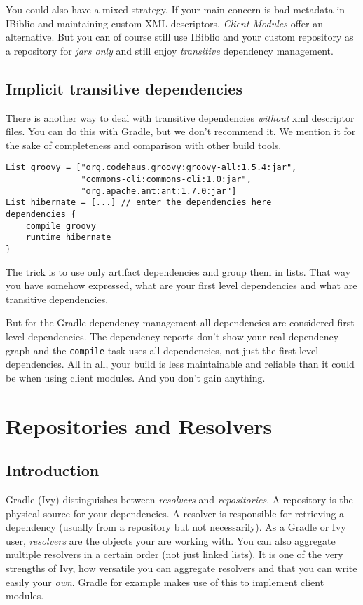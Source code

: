 You could also have a mixed strategy. If your main concern is bad metadata in IBiblio and maintaining custom XML descriptors, \emph{Client Modules} offer an alternative. But you can of course still use IBiblio and your custom repository as a repository for \emph{jars only} and still enjoy \emph{transitive} dependency management.

\subsection{Implicit transitive dependencies} %
\label{sub:implicit_transitive_dependencies}
There is another way to deal with transitive dependencies \emph{without} xml descriptor files. You can do this with Gradle, but we don't recommend it. We mention it for the sake of completeness and comparison with other build tools. 
\begin{Verbatim}
List groovy = ["org.codehaus.groovy:groovy-all:1.5.4:jar", 
               "commons-cli:commons-cli:1.0:jar", 
               "org.apache.ant:ant:1.7.0:jar"]
List hibernate = [...] // enter the dependencies here
dependencies {
	compile groovy
	runtime hibernate
}
\end{Verbatim}
The trick is to use only artifact dependencies and group them in lists. That way you have somehow expressed, what are your first level dependencies and what are transitive dependencies. 

But for the Gradle dependency management all dependencies are considered first level dependencies. The dependency reports don't show your real dependency graph and the \texttt{compile} task uses all dependencies, not just the first level dependencies. All in all, your build is less maintainable and reliable than it could be when using client modules. And you don't gain anything.  

\section{Repositories and Resolvers} %
\label{sec:repositories}

\subsection{Introduction} %
\label{sub:introduction}
Gradle (Ivy) distinguishes between \emph{resolvers} and \emph{repositories}. A repository is the physical source for your dependencies. A resolver is responsible for retrieving a dependency (usually from a repository but not necessarily). As a Gradle or Ivy user, \emph{resolvers} are the objects your are working with. You can also aggregate multiple resolvers in a certain order (not just linked lists). It is one of the very strengths of Ivy, how versatile you can aggregate resolvers and that you can write easily your \emph{own}. Gradle for example makes use of this to implement client modules. 

